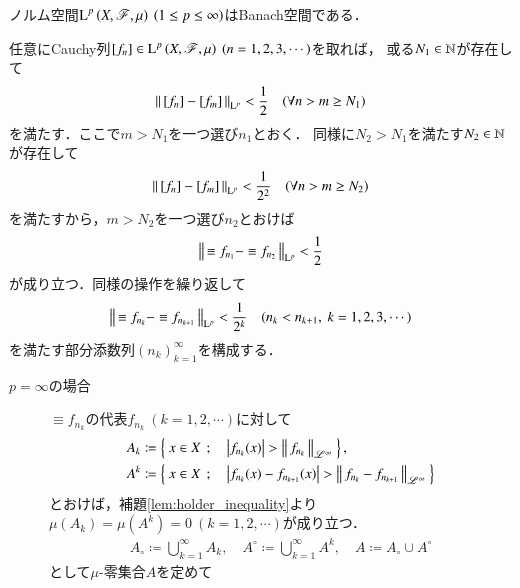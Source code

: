 \begin{screen}
	\begin{thm}
		ノルム空間$\operatorname{L}^{p} \left(X,\mathscr{F},\mu\right)\ (1 \leq p \leq \infty)$はBanach空間である．
		\label{prp:Lp_banach}
	\end{thm}
\end{screen}

\begin{prf}
	任意にCauchy列$[f_n] \in \operatorname{L}^{p} \left(X,\mathscr{F},\mu\right)\ (n=1,2,3,\cdots)$を取れば，
	或る$N_1 \in \mathbb{N}$が存在して
	\begin{align}
		\left\|\, [f_n]-[f_m]\, \right\|_{\mathrm{L}^p} < \frac{1}{2}
		\quad (\forall n > m \geq N_1)
	\end{align}
	を満たす．ここで$m > N_1$を一つ選び$n_1$とおく．
	同様に$N_2 > N_1$を満たす$N_2 \in \mathbb{N}$が存在して
	\begin{align}
		\left\|\, [f_n]-[f_m]\, \right\|_{\mathrm{L}^p} < \frac{1}{2^2}
		\quad (\forall n > m \geq N_2)
	\end{align}
	を満たすから，$m > N_2$を一つ選び$n_2$とおけば
	\begin{align}
		\left\|\, \equiv{f_{n_1}}{} - \equiv{f_{n_2}}{}\, \right\|_{\mathrm{L}^p} < \frac{1}{2}
	\end{align}
	が成り立つ．同様の操作を繰り返して
	\begin{align}
		\left\|\, \equiv{f_{n_k}}{} - \equiv{f_{n_{k+1}}}{}\, \right\|_{\mathrm{L}^p} < \frac{1}{2^k} 
		\quad (n_k < n_{k+1},\ k=1,2,3,\cdots) \label{ineq:Lp_banach_2}
	\end{align}
	を満たす部分添数列$(n_k)_{k=1}^{\infty}$を構成する．
	\begin{description}
		\item[$p = \infty$の場合]
			$\equiv{f_{n_k}}{}$の代表$f_{n_k}\ (k=1,2,\cdots)$に対して
			\begin{align}
				A_k &\coloneqq \left\{\ x \in X\ \, ; \quad \left| f_{n_k}(x) \right| > \left\|\, f_{n_k}\, \right\|_{\mathscr{L}^\infty}\ \right\}, \\
				A^k &\coloneqq \left\{\ x \in X\ \, ; \quad \left| f_{n_k}(x) - f_{n_{k+1}}(x) \right| > \left\|\, f_{n_k} - f_{n_{k+1}}\, \right\|_{\mathscr{L}^\infty}\ \right\}
			\end{align}
			とおけば，補題\ref{lem:holder_inequality}より$\mu(A_k) = \mu(A^k) = 0\ (k=1,2,\cdots)$が成り立つ．
			\begin{align}
				A_\circ \coloneqq \bigcup_{k=1}^{\infty} A_k,
				\quad A^\circ \coloneqq \bigcup_{k=1}^{\infty}A^k,
				\quad A \coloneqq A_\circ \cup A^\circ
			\end{align}
			として$\mu$-零集合$A$を定めて
			\begin{align}

\end{align}
\end{description}
\end{prf}
